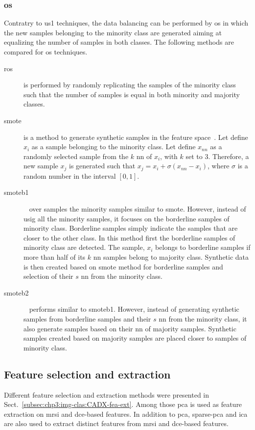 \subsubsection{\Acl*{os}}
Contratry to \ac{us1} techniques, the data balancing can be performed by \ac{os} in which the new samples belonging to the minority class are generated aiming at equalizing the number of samples in both classes.
The following methods are compared for \ac{os} techniques.
\begin{description}
\item[\Ac{ros}] is performed by randomly replicating the samples of the minority class such that the number of samples is equal in both minority and majority classes.
\item[\Ac{smote}] is a method to generate synthetic samples in the feature space~\cite{chawla2002smote}.
Let define $x_i$ as a sample belonging to the minority class.
Let define $x_{nn}$ as a randomly selected sample from the $k$ \ac{nn} of $x_i$, with $k$ set to 3.
Therefore, a new sample $x_j$ is generated such that $x_j = x_i + \sigma \left( x_{nn} - x_i \right)$, where $\sigma$ is a random number in the interval $\left[0,1\right]$.
\item[\Ac{smoteb1}]~\cite{han2005borderline} over samples the minority samples similar to \ac{smote}.
However, instead of usig all the minority samples, it focuses on the borderline samples of minority class.
Borderline samples simply indicate the samples that are closer to the other class.
In this method first the borderline samples of minority class are detected.
The sample, $x_{i}$ belongs to borderline samples if more than half of its $k$ \ac{nn} samples belong to majority class.
Synthetic data is then created based on \ac{smote} method for borderline samples and selection of their $s$ \ac{nn} from the minority class.
 
\item[\Ac{smoteb2}]~\cite{han2005borderline} performs similar to \ac{smoteb1}.
However, instead of generating synthetic samples from borderline samples and their $s$ \ac{nn} from the minority class, it also generate samples based on their \ac{nn} of majority samples.
Synthetic samples created based on majority samples are placed closer to samples of minority class.
\end{description}

\subsection{Feature selection and extraction}\label{subsec:chp6:method:fea-sel}
Different feature selection and extraction methods were presented in Sect.~\ref{subsec:chp3:img-clas:CADX-fea-ext}.
Among those \ac{pca} is used as feature extraction on  \ac{mrsi} and \ac{dce}-based features.
In addition to \ac{pca}, sparse-\ac{pca} and \ac{ica} are also used to extract distinct features from \ac{mrsi} and \ac{dce}-based features.

